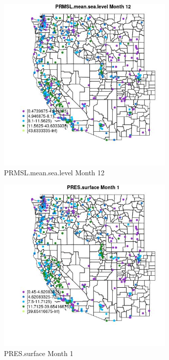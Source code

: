 \clearpage 

\begin{figure} 
\centering  
\includegraphics[width=0.77\textwidth]{Code_Outputs/ML_input_report_ML_input_PM25_Step5_part_d_de_duplicated_aves_ML_input_MapObsMo12PRMSLmeansealevel.jpg} 
\caption{\label{fig:ML_input_report_ML_input_PM25_Step5_part_d_de_duplicated_aves_ML_inputMapObsMo12PRMSLmeansealevel}PRMSL.mean.sea.level Month 12} 
\end{figure} 
 

\begin{figure} 
\centering  
\includegraphics[width=0.77\textwidth]{Code_Outputs/ML_input_report_ML_input_PM25_Step5_part_d_de_duplicated_aves_ML_input_MapObsMo1PRESsurface.jpg} 
\caption{\label{fig:ML_input_report_ML_input_PM25_Step5_part_d_de_duplicated_aves_ML_inputMapObsMo1PRESsurface}PRES.surface Month 1} 
\end{figure} 
 

